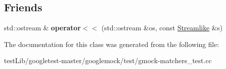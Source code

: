 \subsection*{Friends}
\begin{DoxyCompactItemize}
\item 
\mbox{\label{classtesting_1_1gmock__matchers__test_1_1Streamlike_a4b45ba8c2a5ee61697003f02568df91f}} 
std\+::ostream \& {\bfseries operator$<$$<$} (std\+::ostream \&os, const \hyperlink{classtesting_1_1gmock__matchers__test_1_1Streamlike}{Streamlike} \&s)
\end{DoxyCompactItemize}


The documentation for this class was generated from the following file\+:\begin{DoxyCompactItemize}
\item 
test\+Lib/googletest-\/master/googlemock/test/gmock-\/matchers\+\_\+test.\+cc\end{DoxyCompactItemize}
